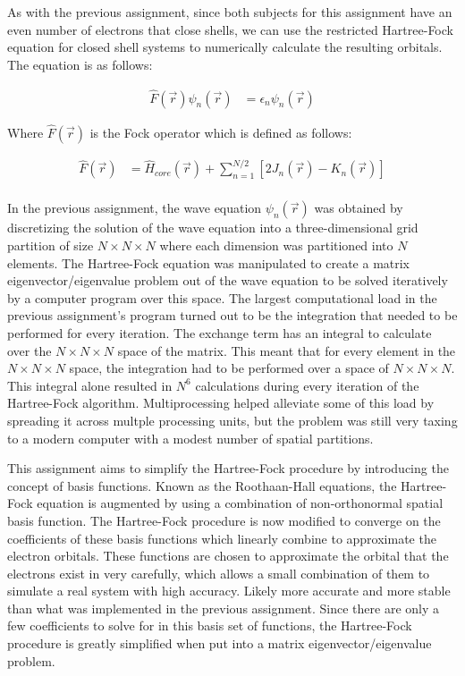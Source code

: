 \documentclass[10pt, oneside, letterpaper]{article}
\begin{document}
As with the previous assignment, since both subjects for this assignment have an even number of electrons that close shells, we can use the restricted Hartree-Fock equation for closed shell systems to numerically calculate the resulting orbitals. The equation is as follows:

\begin{align*}
  \hat{F}(\vec{r})\psi_n(\vec{r}) &= \epsilon_n\psi_n(\vec{r})
\end{align*}

Where $\hat{F}(\vec{r})$ is the Fock operator which is defined as follows:

\begin{align*}
  \hat{F}(\vec{r}) &= \hat{H}_{core}(\vec{r}) + \sum_{n=1}^{N/2}\left[2J_n(\vec{r}) - K_n(\vec{r})\right]\\
\end{align*}

In the previous assignment, the wave equation $\psi_n(\vec{r})$ was obtained by discretizing the solution of the wave equation into a three-dimensional grid partition of size $N \times N \times N$ where each dimension was partitioned into $N$ elements. The Hartree-Fock equation was manipulated to create a matrix eigenvector/eigenvalue problem out of the wave equation to be solved iteratively by a computer program over this space. The largest computational load in the previous assignment's program turned out to be the integration that needed to be performed for every iteration. The exchange term has an integral to calculate over the $N \times N \times N$ space of the matrix. This meant that for every element in the $N \times N \times N$ space, the integration had to be performed over a space of $N \times N \times N$. This integral alone resulted in $N^6$ calculations during every iteration of the Hartree-Fock algorithm. Multiprocessing helped alleviate some of this load by spreading it across multple processing units, but the problem was still very taxing to a modern computer with a modest number of spatial partitions.

This assignment aims to simplify the Hartree-Fock procedure by introducing the concept of basis functions. Known as the Roothaan-Hall equations, the Hartree-Fock equation is augmented by using a combination of non-orthonormal spatial basis function. The Hartree-Fock procedure is now modified to converge on the coefficients of these basis functions which linearly combine to approximate the electron orbitals. These functions are chosen to approximate the orbital that the electrons exist in very carefully, which allows a small combination of them to simulate a real system with high accuracy. Likely more accurate and more stable than what was implemented in the previous assignment. Since there are only a few coefficients to solve for in this basis set of functions, the Hartree-Fock procedure is greatly simplified when put into a matrix eigenvector/eigenvalue problem.
\end{document}
